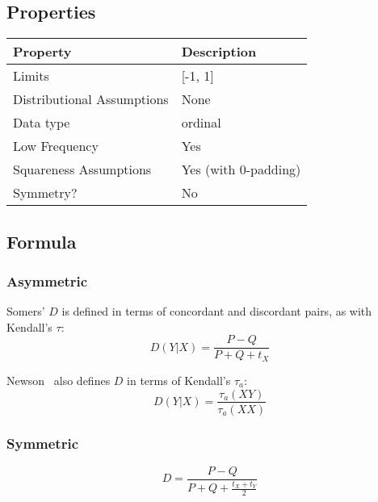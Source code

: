 \documentclass[11pt]{article}
\begin{document}

\subsection{Properties}
\begin{tabular}{| l || l |}
    \hline
    {\bf Property} & {\bf Description} \\
    \hline
    Limits & [-1, 1] \\ \hline

    Distributional Assumptions & None \\ \hline

    Data type & ordinal \\ \hline

    Low Frequency & Yes \\ \hline

    Squareness Assumptions & Yes (with 0-padding) \\ \hline
    
    Symmetry? & No \\ \hline

\end{tabular}


\subsection{Formula}
\subsubsection{Asymmetric}
Somers' $D$ is defined in terms of concordant and discordant pairs, as with Kendall's $\tau$:
$$
D(Y|X) = \frac{ P - Q }{ P + Q + t_X }
$$

Newson~\cite{newson2006confidence} also defines $D$ in terms of Kendall's $\tau_a$:
$$
D(Y|X) = \frac{ \tau_a(XY) }{  \tau_a(XX) }
$$

\subsubsection{Symmetric}
$$
D = \frac{ P - Q } { P + Q + \frac{ t_X + t_Y }{ 2 } }
$$
\end{document}
